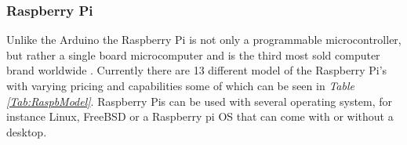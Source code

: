 

\subsubsection{Raspberry Pi}

Unlike the Arduino the Raspberry Pi is not only a programmable microcontroller, but rather a single board microcomputer and is the third most sold computer brand worldwide \cite{noauthor_faqs_nodate}.
Currently there are 13 different model of the Raspberry Pi's with varying pricing and capabilities  some of which can be seen in \textit{Table \ref{Tab:RaspbModel}}. 
Raspberry Pis can be used with several operating system, for instance Linux, FreeBSD or a Raspberry pi OS that can come with or without a desktop.

